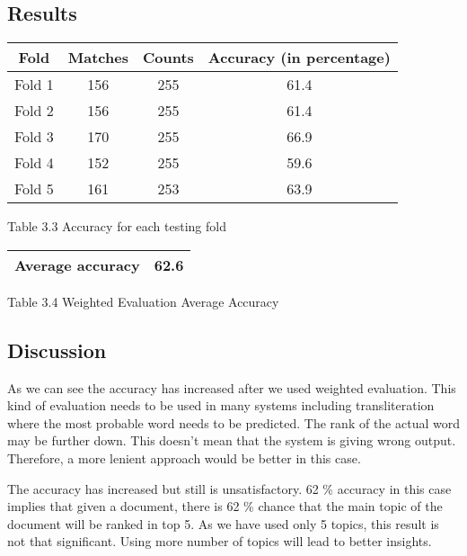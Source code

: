 \subsection*{Results}

\begin{center}
\begin{tabular}{ |c|c|c|c| }
  \hline
  Fold & Matches & Counts & Accuracy (in percentage) \\ \hline
  Fold 1 & 156 & 255 & 61.4 \\ \hline
  Fold 2 & 156 & 255 & 61.4 \\ \hline
  Fold 3 & 170 & 255 & 66.9 \\ \hline
  Fold 4 & 152 & 255 & 59.6 \\ \hline
  Fold 5 & 161 & 253 & 63.9 \\ \hline
\end{tabular}
\end{center}
\begin{center}
 Table 3.3 Accuracy for each testing fold 
\end{center}

\begin{center}
\begin{tabular}{ |c|c| }
  \hline
  Average accuracy & 62.6 \\ \hline
\end{tabular}
\end{center}
\begin{center}
 Table 3.4 Weighted Evaluation Average Accuracy 
\end{center}

\subsection*{Discussion}

\par
As we can see the accuracy has increased after we used weighted evaluation. This kind of evaluation needs to be used in many systems including
transliteration where the most probable word needs to be predicted. The rank of the actual word may be further down. This doesn't mean that the
system is giving wrong output. Therefore, a more lenient approach would be better in this case. 

\par
The accuracy has increased but still is unsatisfactory. 62 \% accuracy in this case implies that given a document, there is 62 \%
chance that the main topic of the document will be ranked in top 5. As we have used only 5 topics, this result is not that significant. Using
more number of topics will lead to better insights. 

